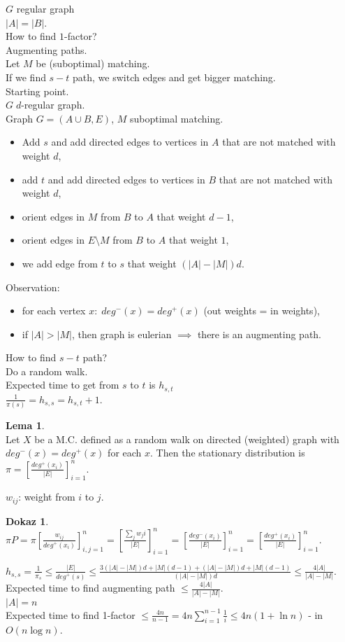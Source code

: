 \documentclass[a4paper, 12pt]{book}
\theoremstyle{definition}
\newtheorem{lemma}[counter]{Lema}
\newtheorem{pro}[counter]{Dokaz}
\theoremstyle{remark}
\begin{document}
$G$ regular graph \\
$|A| = |B|$. \\
How to find $1$-factor? \\
Augmenting paths. \\
Let $M$ be (suboptimal) matching. \\
If we find $s-t$ path, we switch edges and get bigger matching. \\
Starting point. \\
$G \; d$-regular graph. \\
Graph $G = (A \cup B, E)$, $M$ suboptimal matching.
\begin{itemize}
  \item Add $s$ and add directed edges to vertices in $A$ that are not matched with weight $d$,
  \item add $t$ and add directed edges to vertices in $B$ that are not matched with weight $d$,
  \item orient edges in $M$ from $B$ to $A$ that weight $d-1$,
  \item orient edges in $E \setminus M$ from $B$ to $A$ that weight $1$,
  \item we add edge from $t$ to $s$ that weight $(|A| - |M|) d$.
\end{itemize}
Observation:
\begin{itemize}
  \item for each vertex $x: \; deg^{-}(x) = deg^{+}(x)$ (out weights = in weights),
  \item if $|A| > |M|$, then graph is eulerian $\implies$ there is an augmenting path.
\end{itemize}
How to find $s-t$ path? \\
Do a random walk. \\
Expected time to get from $s$ to $t$ is $h_{s,t}$ \\
$\frac{1}{\pi(s)} = h_{s,s} = h_{s,t} + 1$.
\begin{lemma} \text{} \\
  Let $X$ be a M.C. defined as a random walk on directed (weighted) graph with $deg^{-}(x) = deg^{+}(x)$ for each $x$.
  Then the stationary distribution is $\pi = \left[\frac{deg^{+}(x_i)}{|E|}\right]_{i=1}^n$.
\end{lemma}
$w_{ij}$: weight from $i$ to $j$.
\begin{pro} \text{} \\
  $\pi P = \pi \left[\frac{w_{ij}}{deg^{+}(x_i)}\right]_{i,j=1}^n = \left[\frac{\sum_j w_ji}{|E|}\right]_{i=1}^n
  = \left[\frac{deg^{-}(x_i)}{|E|}\right]_{i=1}^n = \left[\frac{deg^{+}(x_i)}{|E|}\right]_{i=1}^n$.
\end{pro}
$h_{s,s} = \frac{1}{\pi_s} \leq \frac{|E|}{deg^{+}(s)} 
\leq \frac{3(|A| - |M|) d + |M| (d-1) + (|A| - |M|) d + |M| (d-1)}{(|A| - |M|) d} \leq \frac{4 |A|}{|A| - |M|}$. \\
Expected time to find augmenting path $\leq \frac{4 |A|}{|A| - |M|}$. \\
$|A| = n$ \\
Expected time to find 1-factor $\leq \frac{4n}{n-1} = 4n \sum_{i=1}^{n-1} \frac{1}{i} \leq 4n (1 + \ln n)$ - in $O(n \log n)$.
\end{document}

